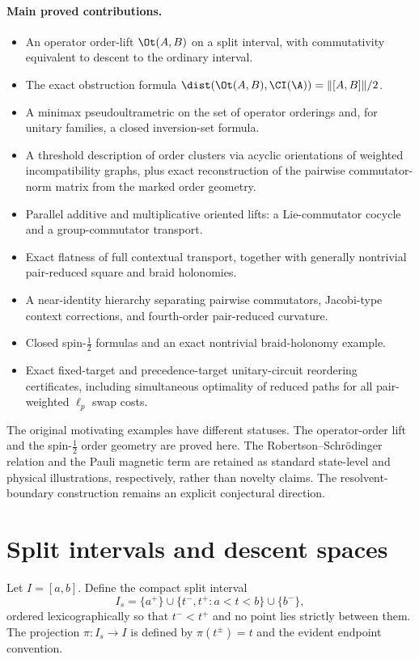 \paragraph{Main proved contributions.}
\begin{itemize}
\item An operator order-lift $\Ot(A,B)$ on a split interval, with commutativity equivalent to descent to the ordinary interval.
\item The exact obstruction formula $\dist(\Ot(A,B),\CI(\A))=\|[A,B]\|/2$.
\item A minimax pseudoultrametric on the set of operator orderings and, for unitary families, a closed inversion-set formula.
\item A threshold description of order clusters via acyclic orientations of weighted incompatibility graphs, plus exact reconstruction of the pairwise commutator-norm matrix from the marked order geometry.
\item Parallel additive and multiplicative oriented lifts: a Lie-commutator cocycle and a group-commutator transport.
\item Exact flatness of full contextual transport, together with generally nontrivial pair-reduced square and braid holonomies.
\item A near-identity hierarchy separating pairwise commutators, Jacobi-type context corrections, and fourth-order pair-reduced curvature.
\item Closed spin-$\tfrac12$ formulas and an exact nontrivial braid-holonomy example.
\item Exact fixed-target and precedence-target unitary-circuit reordering certificates, including simultaneous optimality of reduced paths for all pair-weighted $\ell_p$ swap costs.
\end{itemize}

The original motivating examples have different statuses. The operator-order lift and the spin-$\tfrac12$ order geometry are proved here. The Robertson--Schr\"odinger relation and the Pauli magnetic term are retained as standard state-level and physical illustrations, respectively, rather than novelty claims. The resolvent-boundary construction remains an explicit conjectural direction.

\section{Split intervals and descent spaces}
Let $I=[a,b]$. Define the compact split interval
\[
I_s=\{a^+\}\cup\{t^-,t^+:a<t<b\}\cup\{b^-\},
\]
ordered lexicographically so that $t^-<t^+$ and no point lies strictly between them. The projection $\pi:I_s\to I$ is defined by $\pi(t^\pm)=t$ and the evident endpoint convention.

